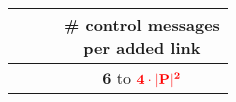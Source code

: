 


\begin{tabularx}{0.90\columnwidth}{@{}cccc@{}}
  \makecell{\color{fg!30}{message}\\\color{fg!30}{overhead}} &  \makecell{\color{fg!30}{delivery}\\\color{fg!30}{execution time}} & \makecell{\color{fg!30}{local space}\\\color{fg!30}{consumption}} & \makecell{\# control messages\\per added link} \\ \hline
  \color{fg!30}{$O(1)$} & \color{fg!30}{$O(|Q_i|)$} & \color{fg!30}{$\mathbf{O(|Q_i|\cdot M)}$} & $\mathbf{6}$ to $\textcolor{red}{\mathbf{4\cdot |P|^2}}$ \\
\end{tabularx}

